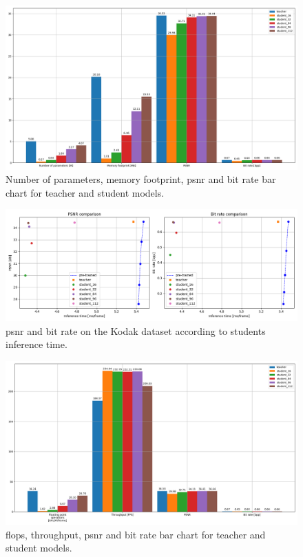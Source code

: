 \begin{figure}
    \centering
    \includegraphics[width=15cm]{img/kd_lic_bar_size.png}
    \caption[Number of parameters, memory footprint, \acrshort{psnr} and bit rate bar chart for teacher and student models.]{Number of parameters, memory footprint, \acrshort{psnr} and bit rate bar chart for teacher and student models.}
    \label{appendix:kd_lic_bar_size}
\end{figure}

\begin{figure}
    \centering
    \includegraphics[width=15cm]{img/kd_lic_time.png}
    \caption[\acrshort{psnr} and bit rate on the Kodak dataset according to students inference time.]{\acrshort{psnr} and bit rate on the Kodak dataset according to students inference time.}
    \label{appendix:kd_lic_time}
\end{figure}

\begin{figure}
    \centering
    \includegraphics[width=15cm]{img/kd_lic_bar_compute.png}
    \caption[\acrshort{flop}s, throughput, \acrshort{psnr} and bit rate bar chart for teacher and student models.]{\acrshort{flop}s, throughput, \acrshort{psnr} and bit rate bar chart for teacher and student models.}
    \label{appendix:kd_lic_bar_compute}
\end{figure}

